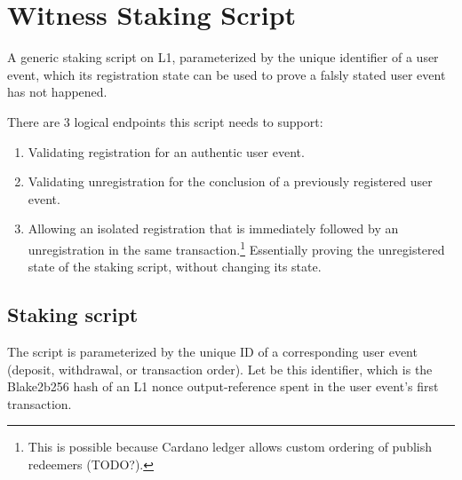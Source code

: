 \documentclass[../midgard.tex]{subfiles}
\begin{document}
\section{Witness Staking Script}
\label{h:witness}

A generic staking script on L1, parameterized by the unique identifier of a user event, which its registration state can be used to prove a falsly stated user event has not happened.

There are 3 logical endpoints this script needs to support:
\begin{enumerate}
    \item Validating registration for an authentic user event.
    \item Validating unregistration for the conclusion of a previously registered user event.
    \item Allowing an isolated registration that is immediately followed by an unregistration in the same transaction.\footnote{This is possible because Cardano ledger allows custom ordering of publish redeemers (TODO?).}
      Essentially proving the unregistered state of the staking script, without changing its state.
\end{enumerate}

\subsection{Staking script}
\label{h:witness-staking-script}
The  script is parameterized by the unique ID of a corresponding user event (deposit, withdrawal, or transaction order).
Let  be this identifier, which is the Blake2b256 hash of an L1 nonce output-reference spent in the user event's first transaction.
\end{document}
